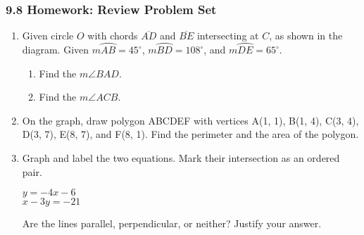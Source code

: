 \documentclass[12pt, twoside]{article}
\begin{document}
\subsubsection*{9.8 Homework: Review Problem Set}
  \begin{enumerate}

   \item Given circle $O$ with chords $\overline{AD}$ and $\overline{BE}$ intersecting at $C$, as shown in the diagram. Given $m \wideparen{AB}=45^\circ$, $m \wideparen{BD}=108^\circ$, and $m \wideparen{DE}=65^\circ$.
     \begin{multicols}{2}
      \raggedcolumns
      \begin{enumerate}
        \item Find the $m\angle BAD$. \vspace{1.7cm}
        \item Find the $m\angle ACB$. \vspace{2cm}
      \end{enumerate}
     \end{multicols}

   \item On the graph, draw polygon ABCDEF with vertices A(1, 1), B(1, 4), C(3, 4), D(3, 7), E(8, 7), and F(8, 1). Find the perimeter and the area of the polygon.\\[1cm]
   \vspace{2cm}

  \newpage
  \item Graph and label the two equations. Mark their intersection as an ordered pair.

    \begin{multicols}{2}
      $y = -4x-6$ \\
      $x-3y = -21$
    \end{multicols}  \vspace{1cm}
    Are the lines parallel, perpendicular, or neither? Justify your answer.
    \vspace{1.5cm}


\end{enumerate}
\end{document}
